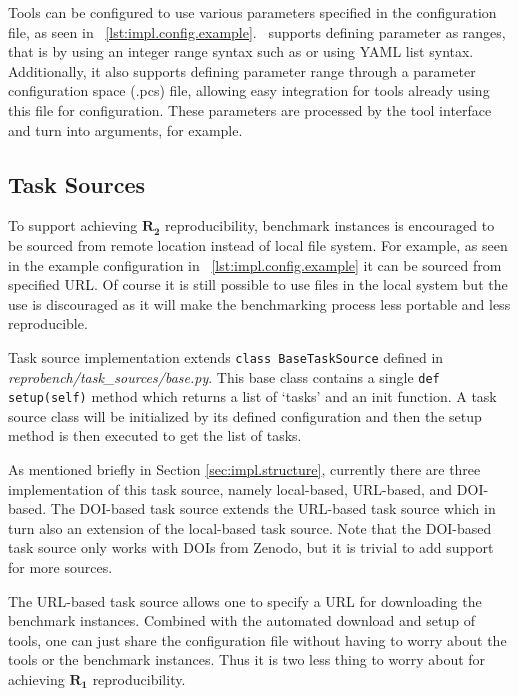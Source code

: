 Tools can be configured to use various parameters specified in the configuration file, as seen in \lst~\ref{lst:impl.config.example}.
\OurBenchmarkingTool~supports defining parameter as ranges, that is by using an integer range syntax such as  or using YAML list syntax.
Additionally, it also supports defining parameter range through a parameter configuration space (.pcs) file, allowing easy integration for tools already using this file for configuration.
These parameters are processed by the tool interface and turn into arguments, for example.


\subsection{Task Sources}

To support achieving \(\bm{R_2}\) reproducibility, benchmark instances is encouraged to be sourced from remote location instead of local file system.
For example, as seen in the example configuration in \lst~\ref{lst:impl.config.example} it can be sourced from specified URL.
Of course it is still possible to use files in the local system but the use is discouraged as it will make the benchmarking process less portable and less reproducible.

Task source implementation extends \texttt{class BaseTaskSource} defined in \emph{reprobench/task\_sources/base.py}.
This base class contains a single \texttt{def setup(self)} method which returns a list of `tasks' and an init function.
A task source class will be initialized by its defined configuration and then the setup method is then executed to get the list of tasks.

As mentioned briefly in Section \ref{sec:impl.structure}, currently there are three implementation of this task source, namely local-based, URL-based, and DOI-based.
The DOI-based task source extends the URL-based task source which in turn also an extension of the local-based task source.
Note that the DOI-based task source only works with DOIs from Zenodo, but it is trivial to add support for more sources.

The URL-based task source allows one to specify a URL for downloading the benchmark instances.
Combined with the automated download and setup of tools, one can just share the configuration file without having to worry about the tools or the benchmark instances.
Thus it is two less thing to worry about for achieving \(\bm{R_1}\) reproducibility.


